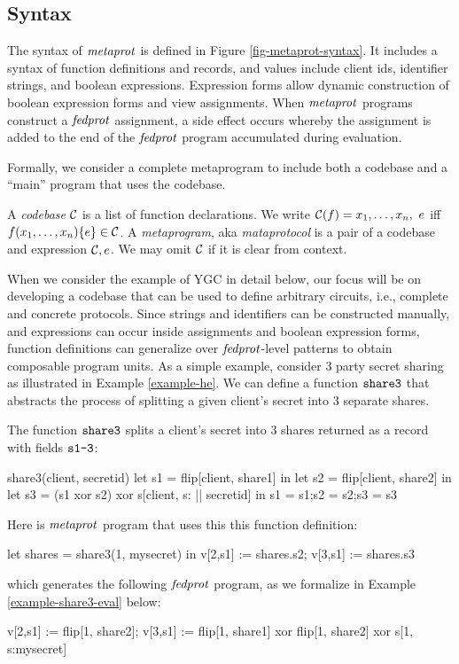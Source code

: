 \subsection{Syntax}

The syntax of $\mathit{metaprot}$ is defined in Figure
\ref{fig-metaprot-syntax}.  It includes a syntax of function
definitions and records, and values include client ids, identifier
strings, and boolean expressions. Expression forms allow dynamic
construction of boolean expression forms and view assignments. When
$\mathit{metaprot}$ programs construct a $\mathit{fedprot}$ assignment, a side effect
occurs whereby the assignment is added to the end of the $\mathit{fedprot}$
program accumulated during evaluation.

Formally, we consider a complete metaprogram to include both a
codebase and a ``main'' program that uses the codebase. 
\begin{definition}
A \emph{codebase} $\mathcal{C}$ is a list of function 
declarations. We write $ \mathcal{C}(f) = x_1,\ldots,x_n,\ e$
iff $f(x_1,\ldots,x_n) \{ e \} \in \mathcal{C}$.
A \emph{metaprogram}, aka \emph{mataprotocol} is a pair of a 
codebase and expression $\mathcal{C}, e$. We may omit
$\mathcal{C}$ if it is clear from context.  
\end{definition}

When we consider the example of YGC in detail below, our focus will be
on developing a codebase that can be used to define arbitrary
circuits, i.e., complete and concrete protocols. Since strings and
identifiers can be constructed manually, and expressions can occur
inside assignments and boolean expression forms, function definitions
can generalize over $\mathit{fedprot}$-level patterns to obtain composable
program units. As a simple example, consider 3 party secret
sharing as illustrated in Example \ref{example-he}. We can
define a function $\texttt{share3}$ that abstracts the process
of splitting a given client's secret into 3 separate shares.
\begin{example} \label{example-share3} The function $\texttt{share3}$ 
  splits a client's secret into 3 shares returned as a record
  with fields $\texttt{s1-3}$:
  \begin{verbatimtab}
    share3(client, secretid)
    {
      let s1 = flip[client, share1] in
      let s2 = flip[client, share2] in
      let s3 = (s1 xor s2) xor s[client, s: || secretid] in
      {s1 = s1;s2 = s2;s3 = s3}
    } \end{verbatimtab}
  Here is $\mathit{metaprot}$ program that uses this this function definition:
  \begin{verbatimtab}
    let shares = share3(1, mysecret) in
    v[2,s1] := shares.s2;
    v[3,s1] := shares.s3 \end{verbatimtab}
  which generates the following $\mathit{fedprot}$ program, as we formalize in Example \ref{example-share3-eval}
  below:
  \begin{verbatimtab}
    v[2,s1] := flip[1, share2];
    v[3,s1] := flip[1, share1] xor flip[1, share2] xor s[1, s:mysecret] \end{verbatimtab}
\end{example}

